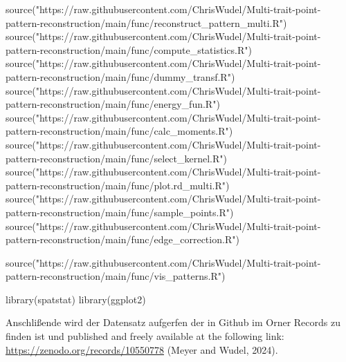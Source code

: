 \documentclass[
  letterpaper,
  DIV=11,
  numbers=noendperiod]{scrreprt}
\newenvironment{Shaded}{\begin{snugshade}}{\end{snugshade}}
\newcommand{\AttributeTok}[1]{\textcolor[rgb]{0.40,0.45,0.13}{#1}}
\newcommand{\ConstantTok}[1]{\textcolor[rgb]{0.56,0.35,0.01}{#1}}
\newcommand{\FunctionTok}[1]{\textcolor[rgb]{0.28,0.35,0.67}{#1}}
\newcommand{\NormalTok}[1]{\textcolor[rgb]{0.00,0.23,0.31}{#1}}
\newcommand{\OtherTok}[1]{\textcolor[rgb]{0.00,0.23,0.31}{#1}}
\newcommand{\SpecialCharTok}[1]{\textcolor[rgb]{0.37,0.37,0.37}{#1}}
\newcommand{\StringTok}[1]{\textcolor[rgb]{0.13,0.47,0.30}{#1}}
\begin{document}
\begin{Shaded}
\begin{Highlighting}[]
\FunctionTok{source}\NormalTok{(}\StringTok{"https://raw.githubusercontent.com/ChrisWudel/Multi{-}trait{-}point{-}pattern{-}reconstruction/main/func/reconstruct\_pattern\_multi.R"}\NormalTok{)}
\FunctionTok{source}\NormalTok{(}\StringTok{"https://raw.githubusercontent.com/ChrisWudel/Multi{-}trait{-}point{-}pattern{-}reconstruction/main/func/compute\_statistics.R"}\NormalTok{)}
\FunctionTok{source}\NormalTok{(}\StringTok{"https://raw.githubusercontent.com/ChrisWudel/Multi{-}trait{-}point{-}pattern{-}reconstruction/main/func/dummy\_transf.R"}\NormalTok{)}
\FunctionTok{source}\NormalTok{(}\StringTok{"https://raw.githubusercontent.com/ChrisWudel/Multi{-}trait{-}point{-}pattern{-}reconstruction/main/func/energy\_fun.R"}\NormalTok{)}
\FunctionTok{source}\NormalTok{(}\StringTok{"https://raw.githubusercontent.com/ChrisWudel/Multi{-}trait{-}point{-}pattern{-}reconstruction/main/func/calc\_moments.R"}\NormalTok{)}
\FunctionTok{source}\NormalTok{(}\StringTok{"https://raw.githubusercontent.com/ChrisWudel/Multi{-}trait{-}point{-}pattern{-}reconstruction/main/func/select\_kernel.R"}\NormalTok{)}
\FunctionTok{source}\NormalTok{(}\StringTok{"https://raw.githubusercontent.com/ChrisWudel/Multi{-}trait{-}point{-}pattern{-}reconstruction/main/func/plot.rd\_multi.R"}\NormalTok{)}
\FunctionTok{source}\NormalTok{(}\StringTok{"https://raw.githubusercontent.com/ChrisWudel/Multi{-}trait{-}point{-}pattern{-}reconstruction/main/func/sample\_points.R"}\NormalTok{)}
\FunctionTok{source}\NormalTok{(}\StringTok{"https://raw.githubusercontent.com/ChrisWudel/Multi{-}trait{-}point{-}pattern{-}reconstruction/main/func/edge\_correction.R"}\NormalTok{)}

\FunctionTok{source}\NormalTok{(}\StringTok{"https://raw.githubusercontent.com/ChrisWudel/Multi{-}trait{-}point{-}pattern{-}reconstruction/main/func/vis\_patterns.R"}\NormalTok{)}

\FunctionTok{library}\NormalTok{(spatstat)}
\FunctionTok{library}\NormalTok{(ggplot2)}
\end{Highlighting}
\end{Shaded}

Anschlißende wird der Datensatz aufgerfen der in Github im Orner Records
zu finden ist und published and freely available at the following link:
\url{https://zenodo.org/records/10550778} (Meyer and Wudel, 2024).

\begin{Shaded}
\end{Shaded}
\end{document}
